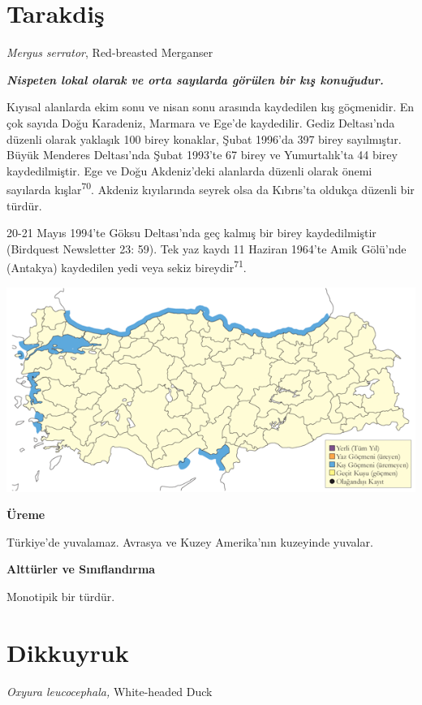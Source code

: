 \documentclass[
  letterpaper,
  DIV=11,
  numbers=noendperiod]{scrreprt}
\begin{document}
\section{Tarakdiş}\label{tarakdiux15f}

\emph{Mergus serrator}, Red-breasted Merganser

\textbf{\emph{Nispeten lokal olarak ve orta sayılarda görülen bir kış
konuğudur.}}

Kıyısal alanlarda ekim sonu ve nisan sonu arasında kaydedilen kış
göçmenidir. En çok sayıda Doğu Karadeniz, Marmara ve Ege'de kaydedilir.
Gediz Deltası'nda düzenli olarak yaklaşık 100 birey konaklar, Şubat
1996'da 397 birey sayılmıştır. Büyük Menderes Deltası'nda Şubat 1993'te
67 birey ve Yumurtalık'ta 44 birey kaydedilmiştir. Ege ve Doğu
Akdeniz'deki alanlarda düzenli olarak önemi sayılarda
kışlar\textsuperscript{70}. Akdeniz kıyılarında seyrek olsa da Kıbrıs'ta
oldukça düzenli bir türdür.

20-21 Mayıs 1994'te Göksu Deltası'nda geç kalmış bir birey
kaydedilmiştir (Birdquest Newsletter 23: 59). Tek yaz kaydı 11 Haziran
1964'te Amik Gölü'nde (Antakya) kaydedilen yedi veya sekiz
bireydir\textsuperscript{71}.

\includegraphics{images/harita_Page_034.png}

\textbf{Üreme}

Türkiye'de yuvalamaz. Avrasya ve Kuzey Amerika'nın kuzeyinde yuvalar.

\textbf{Alttürler ve Sınıflandırma}

Monotipik bir türdür.

\section{Dikkuyruk}\label{sec-dikkuyruk}

\emph{Oxyura leucocephala,} White-headed Duck
\end{document}

